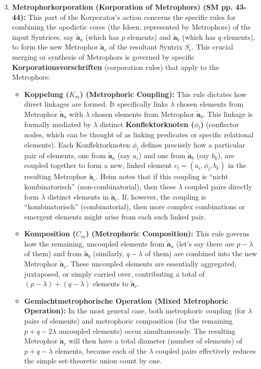\documentclass[12pt]{article}
\newcommand{\q}[1]{\enquote{#1}}
\newcommand{\metrophor}{\bm{\widetilde{a}}}
\begin{document}
\begin{itemize}
    \begin{enumerate}
        \setcounter{enumi}{2} %
        \item \textbf{Metrophorkorporation (Korporation of Metrophors) (SM pp. 43-44):} This part of the Korporator's action concerns the specific rules for combining the apodictic cores (the Ideen, represented by Metrophors) of the input Syntrices, say \( \metrophor_a \) (which has \( p \) elements) and \( \metrophor_b \) (which has \( q \) elements), to form the new Metrophor \( \metrophor_c \) of the resultant Syntrix \( S_c \). This crucial merging or synthesis of Metrophors is governed by specific \textbf{Korporationsvorschriften} (corporation rules) that apply to the Metrophors:
        \begin{itemize}
            \item \textbf{Koppelung (\( K_m \)) (Metrophoric Coupling):} This rule dictates how direct linkages are formed. It specifically links \( \lambda \) chosen elements from Metrophor \( \metrophor_a \) with \( \lambda \) chosen elements from Metrophor \( \metrophor_b \). This linkage is formally mediated by \( \lambda \) distinct \textbf{Konflektorknoten (\( \phi_l \))} (conflector nodes, which can be thought of as linking predicates or specific relational elements). Each Konflektorknoten \( \phi_l \) defines precisely how a particular pair of elements, one from \( \metrophor_a \) (say \( a_i \)) and one from \( \metrophor_b \) (say \( b_k \)), are coupled together to form a new, linked element \( c_l = (a_i, \phi_l, b_k) \) in the resulting Metrophor \( \metrophor_c \). Heim notes that if this coupling is \q{nicht kombinatorisch} (non-combinatorial), then these \( \lambda \) coupled pairs directly form \( \lambda \) distinct elements in \( \metrophor_c \). If, however, the coupling is \q{kombinatorisch} (combinatorial), then more complex combinations or emergent elements might arise from each such linked pair.
            \item \textbf{Komposition (\( C_m \)) (Metrophoric Composition):} This rule governs how the remaining, uncoupled elements from \( \metrophor_a \) (let's say there are \( p-\lambda \) of them) and from \( \metrophor_b \) (similarly, \( q-\lambda \) of them) are combined into the new Metrophor \( \metrophor_c \). These uncoupled elements are essentially aggregated, juxtaposed, or simply carried over, contributing a total of \( (p-\lambda) + (q-\lambda) \) elements to \( \metrophor_c \).
            \item \textbf{Gemischtmetrophorische Operation (Mixed Metrophoric Operation):} In the most general case, both metrophoric coupling (for \( \lambda \) pairs of elements) and metrophoric composition (for the remaining \( p+q-2\lambda \) uncoupled elements) occur simultaneously. The resulting Metrophor \( \metrophor_c \) will then have a total diameter (number of elements) of \( p+q-\lambda \) elements, because each of the \(\lambda\) coupled pairs effectively reduces the simple set-theoretic union count by one.

\end{itemize}
\end{enumerate}
\end{itemize}
\end{document}
